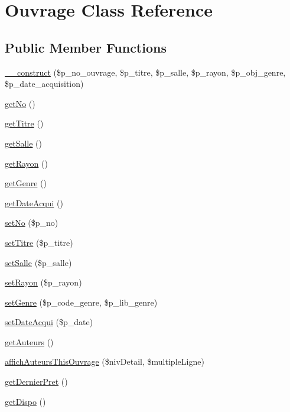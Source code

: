 \hypertarget{class_ouvrage}{}\section{Ouvrage Class Reference}
\label{class_ouvrage}
\subsection*{Public Member Functions}
\begin{DoxyCompactItemize}
\item 
\hyperlink{class_ouvrage_a0d6d9b0a6a5b7f4990369a9214ffd303}{\+\_\+\+\_\+construct} (\$p\+\_\+no\+\_\+ouvrage, \$p\+\_\+titre, \$p\+\_\+salle, \$p\+\_\+rayon, \$p\+\_\+obj\+\_\+genre, \$p\+\_\+date\+\_\+acquisition)
\item 
\hyperlink{class_ouvrage_a564e570c404f71eceea25e7d28cdad04}{get\+No} ()
\item 
\hyperlink{class_ouvrage_a11c380e71778af9871c5bd84b2f50eae}{get\+Titre} ()
\item 
\hyperlink{class_ouvrage_aca023bb97e2b632a2dbb2a6b2307cb70}{get\+Salle} ()
\item 
\hyperlink{class_ouvrage_ac6a6bc548f052164c582117d296d8467}{get\+Rayon} ()
\item 
\hyperlink{class_ouvrage_adc6f217756d49edbac6975e1f69485d5}{get\+Genre} ()
\item 
\hyperlink{class_ouvrage_a5a7ff2c4bfc5bd8257fd2018f4ceab04}{get\+Date\+Acqui} ()
\item 
\hyperlink{class_ouvrage_a47ab0d1e51132fff472aab5bcd9bec0f}{set\+No} (\$p\+\_\+no)
\item 
\hyperlink{class_ouvrage_a35fb1344f3edd545dac2fa780b93dbe2}{set\+Titre} (\$p\+\_\+titre)
\item 
\hyperlink{class_ouvrage_ab6d105fe280639505b0dd0c4098517b7}{set\+Salle} (\$p\+\_\+salle)
\item 
\hyperlink{class_ouvrage_af5ed9ff3b9bc64a656374a71c5b24381}{set\+Rayon} (\$p\+\_\+rayon)
\item 
\hyperlink{class_ouvrage_afc6aee0b5a4a6ccc98d6f0f46bac9f28}{set\+Genre} (\$p\+\_\+code\+\_\+genre, \$p\+\_\+lib\+\_\+genre)
\item 
\hyperlink{class_ouvrage_af1032ad1caa3a99b88439ff560154cbb}{set\+Date\+Acqui} (\$p\+\_\+date)
\item 
\hyperlink{class_ouvrage_a687230920372d7f102960bb09e86eeef}{get\+Auteurs} ()
\item 
\hyperlink{class_ouvrage_a12a78e11bb74dd0a93ea3e5857650e4a}{affich\+Auteurs\+This\+Ouvrage} (\$niv\+Detail, \$multiple\+Ligne)
\item 
\hyperlink{class_ouvrage_a4b75677068888dc7bc613d2d70ccd952}{get\+Dernier\+Pret} ()
\item 
\hyperlink{class_ouvrage_a283e5079d0f579ed83c210845ec392f1}{get\+Dispo} ()
\end{DoxyCompactItemize}


